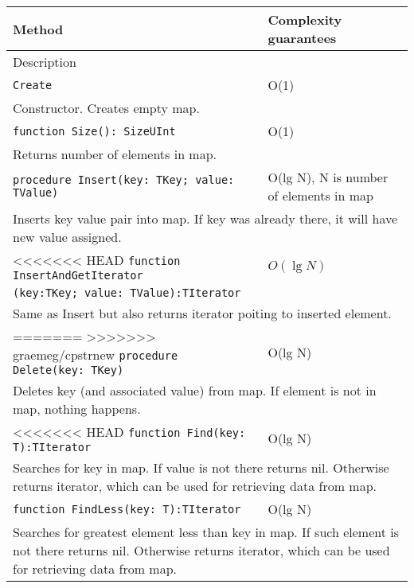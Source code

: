 \begin{longtable}{|m{10cm}|m{5cm}|}
\hline
Method & Complexity guarantees \\ \hline
\multicolumn{2}{|m{15cm}|}{Description} \\ \hline\hline

\verb!Create! & O(1) \\ \hline
\multicolumn{2}{|m{15cm}|}{Constructor. Creates empty map.} \\ \hline\hline

\verb!function Size(): SizeUInt! & O(1) \\ \hline
\multicolumn{2}{|m{15cm}|}{Returns number of elements in map.} \\\hline\hline

\verb!procedure Insert(key: TKey; value: TValue)! &
O(lg N), N is number of elements in map \\ \hline
\multicolumn{2}{|m{15cm}|}{Inserts key value pair into map. If key was already there, it will have
new value assigned.} \\\hline\hline

<<<<<<< HEAD
\verb!function InsertAndGetIterator! & $O(\lg N)$\\
\verb!(key:TKey; value: TValue):TIterator! & \\ \hline
\multicolumn{2}{|m{15cm}|}{Same as Insert but also returns iterator poiting to inserted element.} \\\hline\hline

=======
>>>>>>> graemeg/cpstrnew
\verb!procedure Delete(key: TKey)! &
O(lg N) \\ \hline
\multicolumn{2}{|m{15cm}|}{Deletes key (and associated value) from map. If element is not in map, nothing happens.} \\\hline\hline

<<<<<<< HEAD
\verb!function Find(key: T):TIterator! & O(lg N) \\\hline
\multicolumn{2}{|m{15cm}|}{Searches for key in map. If value is not there returns nil. Otherwise
returns iterator, which can be used for retrieving data from map.} \\\hline\hline

\verb!function FindLess(key: T):TIterator! & O(lg N) \\\hline
\multicolumn{2}{|m{15cm}|}{Searches for greatest element less than key in map. If such element is not there returns nil. Otherwise
returns iterator, which can be used for retrieving data from map.} \\\hline\hline


\end{longtable}
